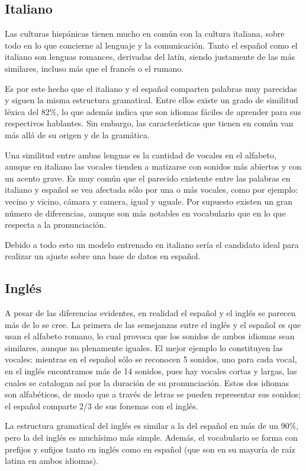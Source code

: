 \subsection{Italiano}
Las culturas hispánicas tienen mucho en común con la cultura italiana, sobre todo en lo que concierne al lenguaje y la comunicación. Tanto el español como el italiano son lenguas romances, derivadas del latín, siendo justamente de las más similares, incluso más que el francés o el rumano.

Es por este hecho que el italiano y el español comparten palabras muy parecidas y siguen la misma estructura gramatical. Entre ellos existe un grado de similitud léxica del 82$\%$, lo que además indica que son idiomas fáciles de aprender para sus respectivos hablantes. Sin embargo, las características que tienen en común van más allá de su origen y de la gramática.

Una similitud entre ambas lenguas es la cantidad de vocales en el alfabeto, aunque en italiano las vocales tienden a matizarse con sonidos más abiertos y con un acento grave. Es muy común que el parecido existente entre las palabras en italiano y español se vea afectada sólo por una o más vocales, como por ejemplo: vecino y vicino, cámara y camera, igual y uguale. Por supuesto existen un gran número de diferencias, aunque son más notables en vocabulario que en lo que respecta a la pronunciación. 

Debido a todo esto un modelo entrenado en italiano sería el candidato ideal para realizar un ajuste sobre una base de datos en español. 
\subsection{Inglés}

A pesar de las diferencias evidentes, en realidad el español y el inglés se parecen más de lo se cree. La primera de las semejanzas entre el inglés y el español es que usan el alfabeto romano, lo cual provoca que los sonidos de ambos idiomas sean similares, aunque no plenamente iguales. El mejor ejemplo lo constituyen las vocales: mientras en el español sólo se reconocen 5 sonidos, uno para cada vocal, en el inglés encontramos más de 14 sonidos, pues hay vocales cortas y largas, las cuales se catalogan así por la duración de su pronunciación. Estos dos idiomas son alfabéticos, de modo que a través de letras se pueden representar sus sonidos; el español comparte 2/3 de sus fonemas con el inglés.

La estructura gramatical del inglés es similar a la del español en más de un 90$\%$, pero la del inglés es muchísimo más simple. Además, el vocabulario se forma con prefijos y sufijos tanto en inglés como en español (que son en su mayoría de raíz latina en ambos idiomas).

